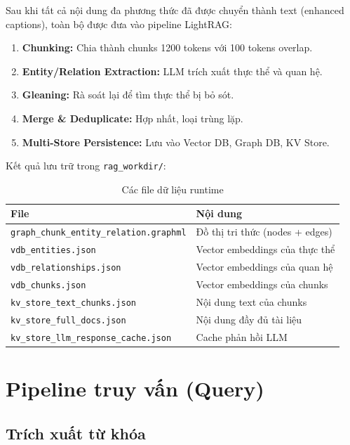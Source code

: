 \documentclass[12pt,a4paper]{article}
\begin{document}
Sau khi tất cả nội dung đa phương thức đã được chuyển thành text (enhanced captions), toàn bộ được đưa vào pipeline LightRAG:

\begin{enumerate}
  \item \textbf{Chunking:} Chia thành chunks 1200 tokens với 100 tokens overlap.
  \item \textbf{Entity/Relation Extraction:} LLM trích xuất thực thể và quan hệ.
  \item \textbf{Gleaning:} Rà soát lại để tìm thực thể bị bỏ sót.
  \item \textbf{Merge \& Deduplicate:} Hợp nhất, loại trùng lặp.
  \item \textbf{Multi-Store Persistence:} Lưu vào Vector DB, Graph DB, KV Store.
\end{enumerate}

Kết quả lưu trữ trong \texttt{rag\_workdir/}:

\begin{table}[H]
\centering
\caption{Các file dữ liệu runtime}
\begin{tabular}{p{6.5cm}p{6.5cm}}
\toprule
\textbf{File} & \textbf{Nội dung} \\
\midrule
\texttt{graph\_chunk\_entity\_relation.graphml} & Đồ thị tri thức (nodes + edges) \\
\texttt{vdb\_entities.json} & Vector embeddings của thực thể \\
\texttt{vdb\_relationships.json} & Vector embeddings của quan hệ \\
\texttt{vdb\_chunks.json} & Vector embeddings của chunks \\
\texttt{kv\_store\_text\_chunks.json} & Nội dung text của chunks \\
\texttt{kv\_store\_full\_docs.json} & Nội dung đầy đủ tài liệu \\
\texttt{kv\_store\_llm\_response\_cache.json} & Cache phản hồi LLM \\
\bottomrule
\end{tabular}
\end{table}

\section{Pipeline truy vấn (Query)}

\subsection{Trích xuất từ khóa}
\end{document}
